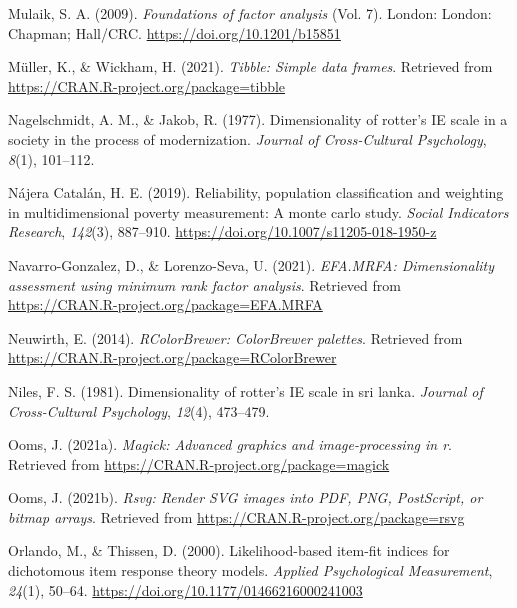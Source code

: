 \documentclass[
  man]{apa6}
\newlength{\cslhangindent}
\newlength{\cslentryspacingunit} %
\newenvironment{CSLReferences}[2] %
 {%
  \setlength{\parindent}{0pt}
  \ifodd #1
  \let\oldpar\par
  \def\par{\hangindent=\cslhangindent\oldpar}
  \fi
  \setlength{\parskip}{#2\cslentryspacingunit}
 }%
 {}
\begin{document}
\begin{CSLReferences}{1}{0}
\leavevmode{}%
Mulaik, S. A. (2009). \emph{Foundations of factor analysis} (Vol. 7). London: London: Chapman; Hall/CRC. \url{https://doi.org/10.1201/b15851}

\leavevmode{}%
Müller, K., \& Wickham, H. (2021). \emph{Tibble: Simple data frames}. Retrieved from \url{https://CRAN.R-project.org/package=tibble}

\leavevmode{}%
Nagelschmidt, A. M., \& Jakob, R. (1977). Dimensionality of rotter's IE scale in a society in the process of modernization. \emph{Journal of Cross-Cultural Psychology}, \emph{8}(1), 101--112.

\leavevmode{}%
Nájera Catalán, H. E. (2019). Reliability, population classification and weighting in multidimensional poverty measurement: A monte carlo study. \emph{Social Indicators Research}, \emph{142}(3), 887--910. \url{https://doi.org/10.1007/s11205-018-1950-z}

\leavevmode{}%
Navarro-Gonzalez, D., \& Lorenzo-Seva, U. (2021). \emph{EFA.MRFA: Dimensionality assessment using minimum rank factor analysis}. Retrieved from \url{https://CRAN.R-project.org/package=EFA.MRFA}

\leavevmode{}%
Neuwirth, E. (2014). \emph{RColorBrewer: ColorBrewer palettes}. Retrieved from \url{https://CRAN.R-project.org/package=RColorBrewer}

\leavevmode{}%
Niles, F. S. (1981). Dimensionality of rotter's IE scale in sri lanka. \emph{Journal of Cross-Cultural Psychology}, \emph{12}(4), 473--479.

\leavevmode{}%
Ooms, J. (2021a). \emph{Magick: Advanced graphics and image-processing in r}. Retrieved from \url{https://CRAN.R-project.org/package=magick}

\leavevmode{}%
Ooms, J. (2021b). \emph{Rsvg: Render SVG images into PDF, PNG, PostScript, or bitmap arrays}. Retrieved from \url{https://CRAN.R-project.org/package=rsvg}

\leavevmode{}%
Orlando, M., \& Thissen, D. (2000). Likelihood-based item-fit indices for dichotomous item response theory models. \emph{Applied Psychological Measurement}, \emph{24}(1), 50--64. \url{https://doi.org/10.1177/01466216000241003}


\end{CSLReferences}
\end{document}
